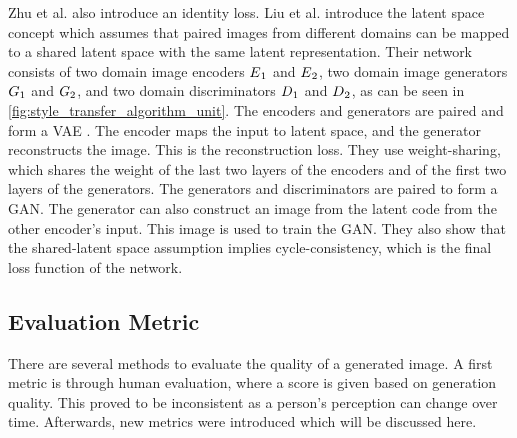 Zhu et al. \cite{Zhu2017b} also introduce an identity loss.
Liu et al. \cite{Liu2017} introduce the latent space concept which assumes that paired images from different domains can be mapped to a shared latent space with the same latent representation.
Their network consists of two domain image encoders $E\textsubscript{$1$}$ and $E\textsubscript{$2$}$, two domain image generators $G\textsubscript{$1$}$ and $G\textsubscript{$2$}$, and two domain discriminators $D\textsubscript{$1$}$ and $D\textsubscript{$2$}$, as can be seen in \ref{fig:style_transfer_algorithm_unit}.
The encoders and generators are paired and form a \gls{VAE} \cite{kingma2022}.
The encoder maps the input to latent space, and the generator reconstructs the image.
This is the reconstruction loss.
They use weight-sharing, which shares the weight of the last two layers of the encoders and of the first two layers of the generators.
The generators and discriminators are paired to form a \gls{GAN}.
The generator can also construct an image from the latent code from the other encoder's input.
This image is used to train the \gls{GAN}.
They also show that the shared-latent space assumption implies cycle-consistency, which is the final loss function of the network.

\begin{figure}
	\centering
\end{figure}

\subsection{Evaluation Metric}
\label{sec:style_transfer_metrics}
There are several methods to evaluate the quality of a generated image. 
A first metric is through human evaluation, where a score is given based on generation quality.
This proved to be inconsistent as a person's perception can change over time.
Afterwards, new metrics were introduced which will be discussed here. \cite{Hoyez2022}

